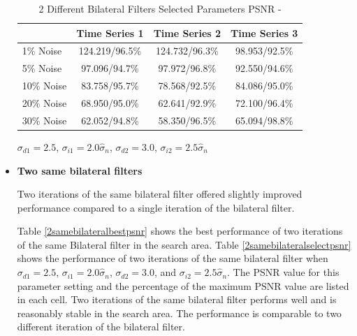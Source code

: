 \documentclass[11pt]{article}
\theoremstyle{definition}
\begin{document}
\begin{itemize}
\begin{table}[!h]
\small
\begin{center}
\begin{tabular}{lccc}
\hline 
 & Time Series 1 & Time Series 2 & Time Series 3 \\ \hline
1\% Noise & 124.219/96.5\% & 124.732/96.3\% & 98.953/92.5\% \\ \hline
5\% Noise & 97.096/94.7\% & 97.972/96.8\% & 92.550/94.6\% \\ \hline
10\% Noise & 83.758/95.7\% & 78.568/92.5\% & 84.086/95.0\% \\ \hline
20\% Noise & 68.950/95.0\% & 62.641/92.9\% & 72.100/96.4\% \\ \hline
30\% Noise & 62.052/94.8\% & 58.350/96.5\% & 65.094/98.8\% \\ \hline
\end{tabular}
\caption{2 Different Bilateral Filters Selected Parameters PSNR -}
 $\sigma_{d1} = 2.5$, $\sigma_{i1} = 2.0 \hat{\sigma}_n$, $\sigma_{d2} = 3.0$, $\sigma_{i2} = 2.5 \hat{\sigma}_n$
\label{2diffbilateralselectpsnr}
\end{center}
\end{table}

\item \textbf{Two same bilateral filters} 

  Two iterations of the same bilateral filter offered slightly
  improved performance compared to a single iteration of the bilateral
  filter.

  Table \ref{2samebilateralbestpsnr} shows the best performance of two
  iterations of the same Bilateral filter in the search area. Table
  \ref{2samebilateralselectpsnr} shows the performance of two
  iterations of the same bilateral filter when $\sigma_{d1} = 2.5$,
  $\sigma_{i1} = 2.0 \hat{\sigma}_n$, $\sigma_{d2} = 3.0$, and
  $\sigma_{i2} = 2.5 \hat{\sigma}_n$. The PSNR value for this
  parameter setting and the percentage of the maximum PSNR value are
  listed in each cell. Two iterations of the same bilateral filter
  performs well and is reasonably stable in the search area. The
  performance is comparable to two different iteration of the
  bilateral filter.


\end{itemize}
\end{document}
